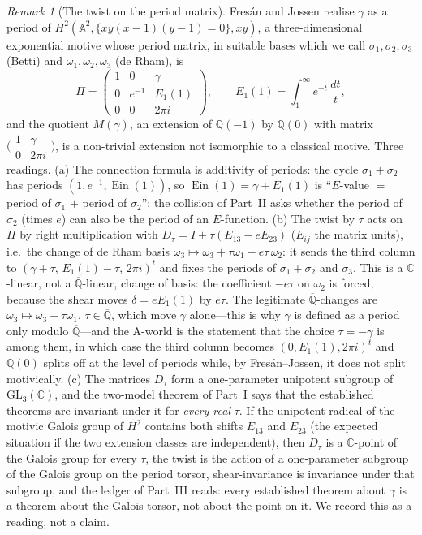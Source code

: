 \documentclass[11pt,a4paper]{article}
\newcommand{\Q}{\mathbb Q}
\newcommand{\C}{\mathbb C}
\newcommand{\Qbar}{\overline{\mathbb Q}}
\newcommand{\Ein}{\operatorname{Ein}}
\theoremstyle{definition}
\theoremstyle{remark}
\newtheorem{remark}[theorem]{Remark}
\numberwithin{equation}{section}
\begin{document}
\begin{remark}[The twist on the period matrix]\label{IV:rem:FJ}
Fres\'an and Jossen realise $\gamma$ as a period of $H^2(\mathbb A^2,\{xy(x-1)(y-1)=0\},xy)$,
a three-dimensional exponential motive whose period matrix, in suitable bases which we
call $\sigma_1,\sigma_2,\sigma_3$ (Betti) and $\omega_1,\omega_2,\omega_3$ (de Rham), is
\cite{FJ,FJtalk}
\[
 \Pi=\begin{pmatrix}1&0&\gamma\\0&e^{-1}&E_1(1)\\0&0&2\pi i\end{pmatrix},
 \qquad E_1(1)=\int_1^\infty e^{-t}\,\frac{dt}{t},
\]
and the quotient $M(\gamma)$, an extension of $\Q(-1)$ by $\Q(0)$ with matrix
$\bigl(\begin{smallmatrix}1&\gamma\\0&2\pi i\end{smallmatrix}\bigr)$, is a non-trivial
extension not isomorphic to a classical motive. Three readings. (a) The connection formula is additivity of periods: the cycle $\sigma_1+\sigma_2$
has periods $(1,e^{-1},\Ein(1))$, so $\Ein(1)=\gamma+E_1(1)$ is ``$E$-value $=$ period of
$\sigma_1$ $+$ period of $\sigma_2$''; the collision of Part~II asks whether the period of
$\sigma_2$ (times $e$) can also be the period of an $E$-function. (b) The twist by $\tau$
acts on $\Pi$ by right multiplication with $D_\tau=I+\tau(E_{13}-eE_{23})$ ($E_{ij}$ the
matrix units), i.e.\ the change of de Rham basis $\omega_3\mapsto\omega_3+\tau\omega_1-e\tau\,\omega_2$:
it sends the third column to $(\gamma+\tau,\,E_1(1)-\tau,\,2\pi i)^t$ and fixes the periods
of $\sigma_1+\sigma_2$ and $\sigma_3$. This is a $\C$-linear, not a $\Qbar$-linear, change
of basis: the coefficient $-e\tau$ on $\omega_2$ is forced, because the shear moves
$\delta=eE_1(1)$ by $e\tau$. The legitimate $\Qbar$-changes are $\omega_3\mapsto\omega_3+\tau\omega_1$,
$\tau\in\Qbar$, which move $\gamma$ alone---this is why $\gamma$ is defined as a period only
modulo $\Qbar$---and the $\mathrm A$-world is the statement that the choice $\tau=-\gamma$
is among them, in which case the third column becomes $(0,E_1(1),2\pi i)^t$ and $\Q(0)$
splits off at the level of periods while, by Fres\'an--Jossen, it does not split
motivically. (c) The matrices $D_\tau$ form a one-parameter unipotent subgroup of
$\mathrm{GL}_3(\C)$, and the two-model theorem of Part~I says that the established theorems
are invariant under it for \emph{every real} $\tau$. If the unipotent radical of the
motivic Galois group of $H^2$ contains both shifts $E_{13}$ and $E_{23}$ (the expected
situation if the two extension classes are independent), then $D_\tau$ is a $\C$-point of
the Galois group for every $\tau$, the twist is the action of a one-parameter subgroup of
the Galois group on the period torsor, shear-invariance is invariance under that
subgroup, and the ledger of Part~III reads: every established theorem about $\gamma$ is a
theorem about the Galois torsor, not about the point on it. We record this as a reading,
not a claim.
\end{remark}
\end{document}

